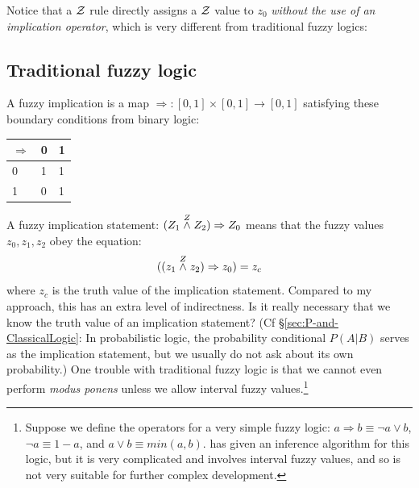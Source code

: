 Notice that a $\mathcal{Z}$ rule directly assigns a $\mathcal{Z}$ value to $z_0$ \textit{without the use of an implication operator}, which is very different from traditional fuzzy logics:

\subsection{Traditional fuzzy logic}

A fuzzy implication is a map $\Rightarrow: [0,1] \times [0,1] \rightarrow [0,1]$ satisfying these boundary conditions from binary logic:\\
\hspace*{1cm} \begin{tabular}{|l|l|l|} \hline
$\Rightarrow$ & 0 & 1\\ \hline
0             & 1 & 1\\
1             & 0 & 1\\ \hline
\end{tabular}

A fuzzy implication statement:  $(Z_1 \stackrel{Z}{\wedge} Z_2) \Rightarrow Z_0$  means that the fuzzy values $z_0,z_1,z_2$ obey the equation:
$$ ((z_1 \stackrel{Z}{\wedge} z_2) \Rightarrow z_0) = z_c $$
where $z_c$ is the truth value of the implication statement.  Compared to my approach, this has an extra level of indirectness.  Is it really necessary that we know the truth value of an implication statement?  (Cf \S\ref{sec:P-and-ClassicalLogic}: In probabilistic logic, the probability conditional $P(A|B)$ serves as the implication statement, but we usually do not ask about its own probability.)  One trouble with traditional fuzzy logic is that we cannot even perform \textit{modus ponens} unless we allow interval fuzzy values.\footnote{Suppose we define the operators for a very simple fuzzy logic: $a \Rightarrow b \equiv \neg a \vee b$, $\neg a \equiv 1-a $, and $a \vee b \equiv min(a,b)$.  \citep*{Kenevan1992} has given an inference algorithm for this logic, but it is very complicated and involves interval fuzzy values, and so is not very suitable for further complex development.}




